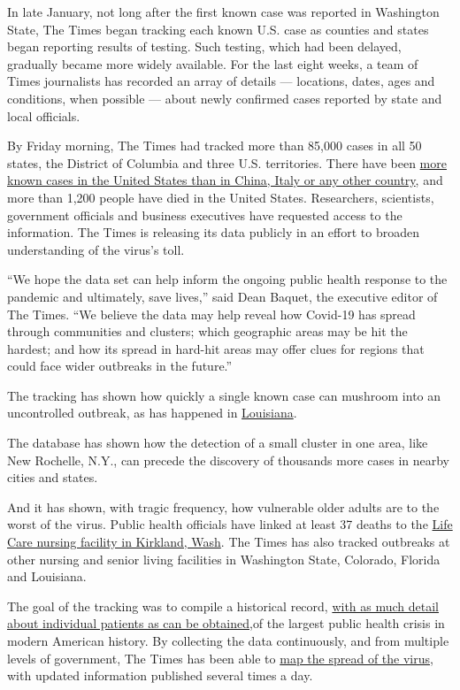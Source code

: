 In late January, not long after the first known case was reported in
Washington State, The Times began tracking each known U.S. case as
counties and states began reporting results of testing. Such testing,
which had been delayed, gradually became more widely available. For the
last eight weeks, a team of Times journalists has recorded an array of
details --- locations, dates, ages and conditions, when possible ---
about newly confirmed cases reported by state and local officials.

By Friday morning, The Times had tracked more than 85,000 cases in all
50 states, the District of Columbia and three U.S. territories. There
have been
\href{https://www.nytimes.com/2020/03/26/health/usa-coronavirus-cases.html}{more
known cases in the United States than in China, Italy or any other
country}, and more than 1,200 people have died in the United States.
Researchers, scientists, government officials and business executives
have requested access to the information. The Times is releasing its
data publicly in an effort to broaden understanding of the virus's toll.

``We hope the data set can help inform the ongoing public health
response to the pandemic and ultimately, save lives,'' said Dean Baquet,
the executive editor of The Times. ``We believe the data may help reveal
how Covid-19 has spread through communities and clusters; which
geographic areas may be hit the hardest; and how its spread in hard-hit
areas may offer clues for regions that could face wider outbreaks in the
future.''

The tracking has shown how quickly a single known case can mushroom into
an uncontrolled outbreak, as has happened in
\href{https://www.nytimes.com/2020/03/26/us/coronavirus-louisiana-new-orleans.html}{Louisiana}.

The database has shown how the detection of a small cluster in one area,
like New Rochelle, N.Y., can precede the discovery of thousands more
cases in nearby cities and states.

And it has shown, with tragic frequency, how vulnerable older adults are
to the worst of the virus. Public health officials have linked at least
37 deaths to the
\href{https://www.nytimes.com/2020/03/21/us/coronavirus-nursing-home-kirkland-life-care.html}{Life
Care nursing facility in Kirkland, Wash}. The Times has also tracked
outbreaks at other nursing and senior living facilities in Washington
State, Colorado, Florida and Louisiana.

The goal of the tracking was to compile a historical record,
\href{https://www.nytimes.com/interactive/2020/03/21/us/coronavirus-us-cases-spread.html}{with
as much detail about individual patients as can be obtained,}of the
largest public health crisis in modern American history. By collecting
the data continuously, and from multiple levels of government, The Times
has been able to
\href{https://www.nytimes.com/interactive/2020/us/coronavirus-us-cases.html}{map
the spread of the virus}, with updated information published several
times a day.

